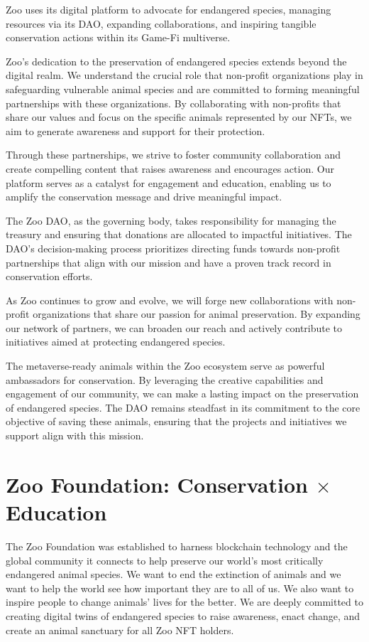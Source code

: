 Zoo uses its digital platform to advocate for endangered species, managing resources via its DAO, expanding collaborations, and inspiring tangible conservation actions within its Game-Fi multiverse.

Zoo's dedication to the preservation of endangered species extends beyond the digital realm. We understand the crucial role that non-profit organizations play in safeguarding vulnerable animal species and are committed to forming meaningful partnerships with these organizations. By collaborating with non-profits that share our values and focus on the specific animals represented by our NFTs, we aim to generate awareness and support for their protection.

Through these partnerships, we strive to foster community collaboration and create compelling content that raises awareness and encourages action. Our platform serves as a catalyst for engagement and education, enabling us to amplify the conservation message and drive meaningful impact.

The Zoo DAO, as the governing body, takes responsibility for managing the treasury and ensuring that donations are allocated to impactful initiatives. The DAO's decision-making process prioritizes directing funds towards non-profit partnerships that align with our mission and have a proven track record in conservation efforts.

As Zoo continues to grow and evolve, we will forge new collaborations with non-profit organizations that share our passion for animal preservation. By expanding our network of partners, we can broaden our reach and actively contribute to initiatives aimed at protecting endangered species.

The metaverse-ready animals within the Zoo ecosystem serve as powerful ambassadors for conservation. By leveraging the creative capabilities and engagement of our community, we can make a lasting impact on the preservation of endangered species. The DAO remains steadfast in its commitment to the core objective of saving these animals, ensuring that the projects and initiatives we support align with this mission.

\section{Zoo Foundation: Conservation \texorpdfstring{$\times$}{x} Education}
\label{sec:foundation}

The Zoo Foundation was established to harness blockchain technology and the global community it connects to help preserve our world's most critically endangered animal species. We want to end the extinction of animals and we want to help the world see how important they are to all of us. We also want to inspire people to change animals' lives for the better. We are deeply committed to creating digital twins of endangered species to raise awareness, enact change, and create an animal sanctuary for all Zoo NFT holders.

